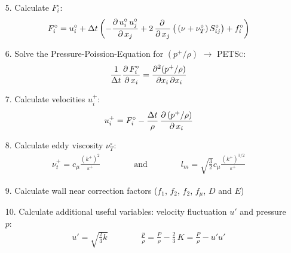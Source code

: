 \begin{itemize}
\item[5.] Calculate $F_i^\circ$:
\begin{align}
F_i^\circ=u_i^\circ+\Delta t\left(-\frac{\partial\,u_i^\circ\,u_j^\circ}{\partial\,x_j} +2\,\frac{\partial\,}{\partial\,x_j} \left( \,\left(\nu+\nu_T^\circ\right)S_{ij}^\circ\right)+f_i^\circ  \right)
\end{align}
\item[6.] Solve the Pressure-Poission-Equation for $(p^+/\rho)$ $\rightarrow$ \textsc{PETSc}:
\begin{align}
\frac{1}{\Delta t} \frac{\partial\,F_i^\circ}{\partial\,x_i}  =
\frac{\partial^2 (p^+/\rho)}{\partial x_i\,\partial x_i}
\end{align}
\item[7.] Calculate velocities $u_i^+$:
\begin{align}
u_i^+
=F_i^\circ-\frac{\Delta t}{\rho}\,\frac{\partial\,(p^+/\rho)}{\partial\,x_i}
\end{align}
\item[8.] Calculate eddy viscosity $\nu_T^\circ$:
\begin{align}
\nu_{t}^+=c_\mu\frac{\left(k^+\right)^2}{\varepsilon^+}
\qquad\qquad\text{and}\qquad\qquad
l_m = \sqrt{\frac{3}{2}} c_\mu\frac{\left(k^+\right)^{3/2}}{\varepsilon^+}
\end{align}
\vspace{-0.5cm}
\item[9.] Calculate wall near correction factors ($f_1$, $f_2$, $f_2$, $f_{\mu}$, $D$ and $E$)
\item[10.] Calculate additional useful variables: velocity fluctuation $u'$ and pressure $p$:
\begin{align}
u'=\sqrt{\frac{2}{3}k}\qquad\qquad
\frac{{p}}{\rho}=\frac{{P}}{\rho}-\frac{2}{3}\,K=\frac{{P}}{\rho}-u'u'
\end{align}
\end{itemize}





